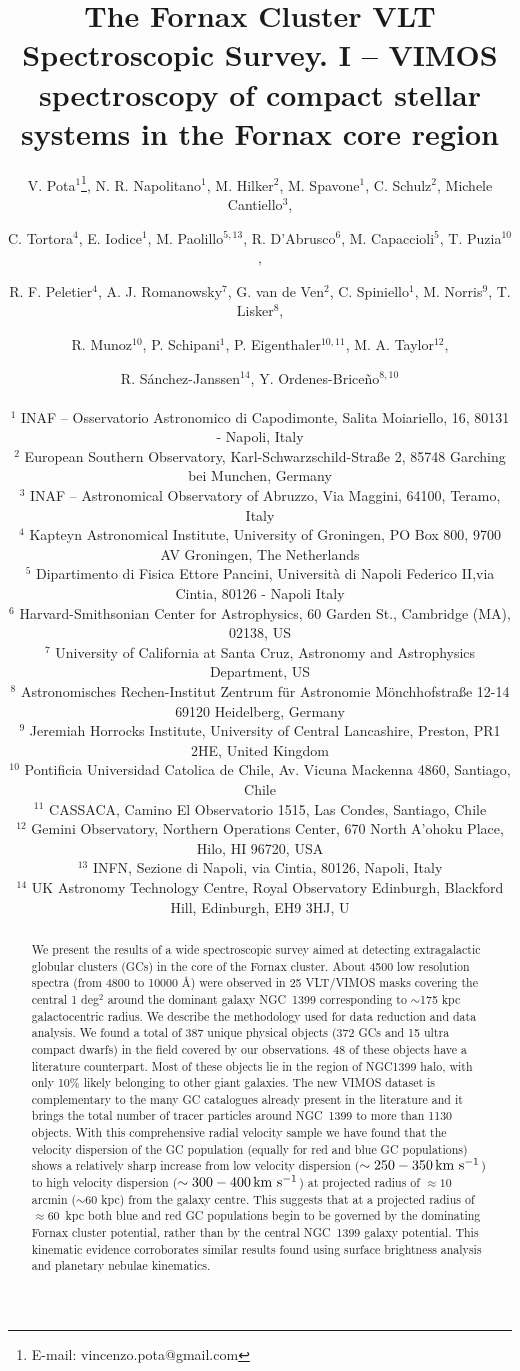\documentclass[usenatbib]{mnras}
\title[The Fornax Cluster VLT Spectroscopic Survey]{The Fornax Cluster VLT
Spectroscopic Survey. I -- VIMOS spectroscopy of compact stellar systems in the Fornax core region}
\author[Pota et al.]{\noindent
V. Pota$^{1}$\thanks{E-mail: vincenzo.pota@gmail.com},
N. R. Napolitano$^{1}$,
M. Hilker$^{2}$,
M. Spavone$^{1}$,
C. Schulz$^{2}$,
Michele Cantiello$^{3}$,
\and
C. Tortora$^{4}$,
E. Iodice$^{1}$,
M. Paolillo$^{5,13}$,
R. D'Abrusco$^{6}$,
M. Capaccioli$^{5}$,
T. Puzia$^{10}$ ,
\and
R. F. Peletier$^{4}$,
A. J. Romanowsky$^{7}$,
G. van de Ven$^{2}$,
C. Spiniello$^{1}$,
M. Norris$^{9}$,
T. Lisker$^{8}$,
\and
R. Munoz$^{10}$,
P. Schipani$^{1}$,
P. Eigenthaler$^{10,11}$,
M. A. Taylor$^{12}$,
\and
R. S\'anchez-Janssen$^{14}$,
Y. Ordenes-Brice\~no$^{8,10}$
\\~\\
$^1$ INAF -- Osservatorio Astronomico di Capodimonte, Salita Moiariello, 16, 80131 - Napoli, Italy\\
$^2$ European Southern Observatory, Karl-Schwarzschild-Stra{\ss}e 2, 85748 Garching bei Munchen, Germany\\
$^3$ INAF -- Astronomical Observatory of Abruzzo, Via Maggini, 64100, Teramo, Italy\\
$^4$ Kapteyn Astronomical Institute, University of Groningen, PO Box 800, 9700 AV Groningen, The Netherlands\\
$^5$ Dipartimento di Fisica Ettore Pancini, Universit\`a di Napoli Federico II,via Cintia, 80126 - Napoli Italy\\
$^6$ Harvard-Smithsonian Center for Astrophysics, 60 Garden St., Cambridge (MA), 02138, US\\
$^7$ University of California at Santa Cruz, Astronomy and Astrophysics Department, US\\
$^8$ Astronomisches Rechen-Institut Zentrum f{\"u}r Astronomie M{\"o}nchhofstra{\ss}e 12-14 69120 Heidelberg, Germany \\
$^9$ Jeremiah Horrocks Institute, University of Central Lancashire, Preston, PR1 2HE, United Kingdom\\
$^{10}$ Pontificia Universidad Catolica de Chile, Av. Vicuna Mackenna 4860, Santiago, Chile \\
$^{11}$ CASSACA, Camino El Observatorio 1515, Las Condes, Santiago, Chile\\
$^{12}$ Gemini Observatory, Northern Operations Center, 670 North A'ohoku Place, Hilo, HI 96720, USA\\
$^{13}$ INFN, Sezione di Napoli, via Cintia, 80126, Napoli, Italy\\
$^{14}$ UK Astronomy Technology Centre, Royal Observatory Edinburgh, Blackford Hill, Edinburgh, EH9 3HJ, U
}
\newcommand{\kms}{\mbox{\,km~s$^{-1}$}}
\begin{document}
\label{firstpage}

\maketitle
\begin{abstract}
We present the results of a wide spectroscopic survey aimed at detecting
extragalactic globular clusters (GCs) in the core of the Fornax cluster.
About 4500 low resolution spectra (from 4800
to 10000 \AA) were observed in 25 VLT/VIMOS masks covering the central 1 deg$^2$
around the dominant galaxy NGC~1399 corresponding to $\sim$175 kpc galactocentric radius.
We describe the methodology used for data reduction and data analysis. We found a total of
387 unique physical objects (372 GCs and 15 ultra compact dwarfs) in the field
covered by our observations. 48 of these objects have a literature counterpart.
Most of these objects lie in the region of NGC1399 halo, with only
10\% likely belonging to other giant galaxies.
The new VIMOS dataset is complementary to the many
GC catalogues already present in the literature and it brings the total number
of tracer particles around  NGC~1399 to more than 1130 objects.
With this comprehensive radial velocity sample we have found that the velocity
dispersion of the GC population (equally for red and blue GC populations) shows
a relatively sharp increase from low velocity dispersion ($\sim 250-350 \kms$)
to high velocity dispersion ($\sim 300-400 \kms$) at projected radius of $\approx10$ arcmin
($\sim 60$ kpc) from the galaxy centre.
This suggests that at a projected radius of $\approx60$~kpc both blue and red GC populations
begin to be governed by the dominating Fornax cluster potential, rather than by the central
NGC~1399 galaxy potential. This kinematic evidence corroborates similar results found using
surface brightness analysis and planetary nebulae kinematics.
\end{abstract}
\end{document}
